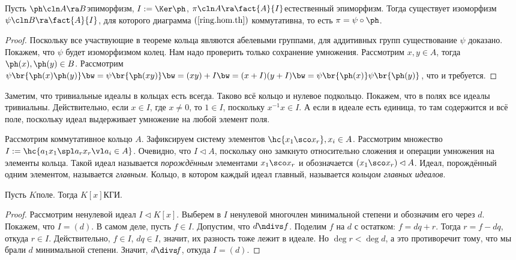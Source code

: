 \documentclass[a4paper]{article}
\newcommand{\kph}{\Ker \ph}
\begin{document}
\begin{theorem}
Пусть $\ph\cln A \ra B$\т эпиморфизм, $I := \kph$, $\pi\cln A \ra \fact{A}{I}$\т  естественный эпиморфизм.
Тогда существует изоморфизм $\psi\cln B \ra \fact{A}{I}$, для которого диаграмма $(\ref{ring.hom.th})$
коммутативна, то есть $\pi = \psi \circ \ph$. 
\end{theorem}
\begin{proof}
Поскольку все участвующие в теореме кольца являются абелевыми группами, для  аддитивных групп существование
$\psi$ доказано. Покажем, что $\psi$ будет изоморфизмом колец. Нам надо проверить только сохранение
умножения. Рассмотрим $x,y \in A$, тогда $\ph(x), \ph(y) \in B$. Рассмотрим
$\psi\br{\ph(x)\ph(y)}\bw=\psi\br{\ph(xy)}\bw=(xy)+I\bw=(x+I)(y+I)\bw=\psi\br{\ph(x)}\psi\br{\ph(y)}$, что и требуется.
\end{proof}

Заметим, что тривиальные идеалы в кольцах есть всегда. Таково всё кольцо и  нулевое подкольцо. Покажем, что в
полях все идеалы тривиальны. Действительно, если $x \in I$, где $x \neq 0$, то $1 \in I$, поскольку $x^{-1}x
\in I$. А если в идеале есть единица, то там содержится и всё поле, поскольку идеал выдерживает умножение на
любой элемент поля.

\begin{df}
Рассмотрим коммутативное кольцо $A$. Зафиксируем систему элементов  $\hc{x_1\sco x_r}, x_i \in A$. Рассмотрим
множество $I := \hc{a_1x_1 \spl a_rx_r\vl a_i \in A}$. Очевидно, что $I \lhd A$, поскольку оно замкнуто
относительно сложения и операции умножения на элементы кольца. Такой идеал называется \emph{порождённым}
элементами $x_1\sco x_r$ и обозначается $(x_1\sco x_r) \lhd A$. Идеал, порождённый одним элементом,
называется \emph{главным}. Кольцо, в котором каждый идеал главный, называется \emph{кольцом главных идеалов}.
\end{df}

\begin{theorem}
Пусть $K$\т поле. Тогда $K[x]$\т КГИ.
\end{theorem}
\begin{proof}
Рассмотрим ненулевой идеал $I \lhd K[x]$. Выберем в $I$ ненулевой многочлен  минимальной степени и обозначим
его через $d$. Покажем, что $I = (d)$. В самом деле, пусть $f \in I$. Допустим, что $d \ndivs f$. Поделим $f$
на $d$ с остатком: $f=dq+r$. Тогда $r=f-dq$, откуда $r \in I$. Действительно, $f \in I$, $dq \in I$, значит, их
разность тоже лежит в идеале. Но $\deg r < \deg d$, а это противоречит тому, что мы брали $d$ минимальной
степени. Значит, $d \divs \!f$, откуда $I=(d)$.
\end{proof}
\end{document}
